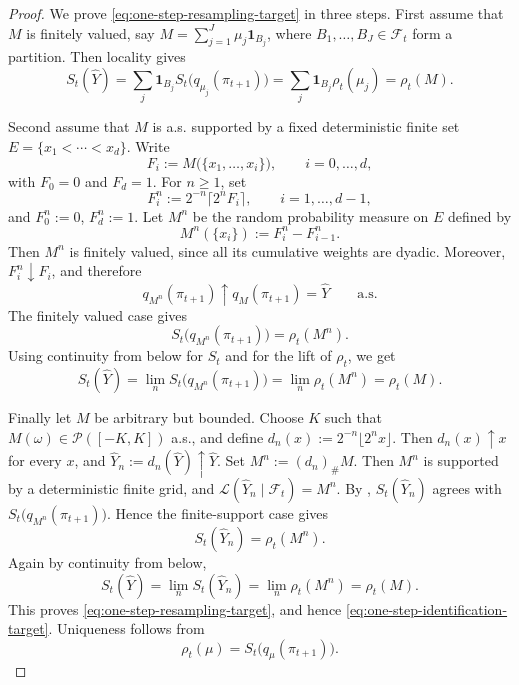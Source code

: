 \documentclass[a4paper]{amsart}
\theoremstyle{definition}
\newcommand{\F}{\mathcal{F}}
\newcommand{\law}{\mathcal{L}}
\newcommand{\Pc}{\mathcal P}
\begin{document}
\begin{proof}
We prove \eqref{eq:one-step-resampling-target} in three steps. First assume
that \(M\) is finitely valued, say
\(M=\sum_{j=1}^J\mu_j\mathbf 1_{B_j}\), where
\(B_1,\dots,B_J\in\F_t\) form a partition. Then locality gives
\[
S_t(\widehat Y)
=
\sum_j\mathbf 1_{B_j}S_t\big(q_{\mu_j}(\pi_{t+1})\big)
=
\sum_j\mathbf 1_{B_j}\rho_t(\mu_j)
=
\rho_t(M).
\]

Second assume that \(M\) is a.s. supported by a fixed deterministic finite set
\(E=\{x_1<\cdots<x_d\}\). Write
\[
F_i:=M\big(\{x_1,\dots,x_i\}\big),
\qquad i=0,\dots,d,
\]
with \(F_0=0\) and \(F_d=1\). For \(n\ge1\), set
\[
F_i^n:=2^{-n}\lceil 2^nF_i\rceil,
\qquad i=1,\dots,d-1,
\]
and \(F_0^n:=0\), \(F_d^n:=1\). Let \(M^n\) be the random probability measure
on \(E\) defined by
\[
M^n(\{x_i\}) := F_i^n-F_{i-1}^n.
\]
Then \(M^n\) is finitely valued, since all its cumulative weights are dyadic.
Moreover, \(F_i^n\downarrow F_i\), and therefore
\[
q_{M^n}(\pi_{t+1})\uparrow q_M(\pi_{t+1})=\widehat Y
\qquad\text{a.s.}
\]
The finitely valued case gives
\[
S_t\big(q_{M^n}(\pi_{t+1})\big)=\rho_t(M^n).
\]
Using continuity from below for \(S_t\) and for the lift of \(\rho_t\), we get
\[
S_t(\widehat Y)
=
\lim_n S_t\big(q_{M^n}(\pi_{t+1})\big)
=
\lim_n \rho_t(M^n)
=
\rho_t(M).
\]

Finally let \(M\) be arbitrary but bounded. Choose \(K\) such that
\(M(\omega)\in\Pc([-K,K])\) a.s., and define
\(d_n(x):=2^{-n}\lfloor 2^nx\rfloor\). Then \(d_n(x)\uparrow x\) for every
\(x\), and \(\widehat Y_n:=d_n(\widehat Y)\uparrow \widehat Y\). Set
\(M^n:=(d_n)_\#M\). Then \(M^n\) is supported by a deterministic finite grid,
and \(\law(\widehat Y_n\mid\F_t)=M^n\). By
, \(S_t(\widehat Y_n)\) agrees with
\(S_t\big(q_{M^n}(\pi_{t+1})\big)\). Hence the finite-support case gives
\[
S_t(\widehat Y_n)=\rho_t(M^n).
\]
Again by continuity from below,
\[
S_t(\widehat Y)
=
\lim_n S_t(\widehat Y_n)
=
\lim_n \rho_t(M^n)
=
\rho_t(M).
\]
This proves \eqref{eq:one-step-resampling-target}, and hence
\eqref{eq:one-step-identification-target}. Uniqueness follows from
\[
\rho_t(\mu)=S_t\big(q_\mu(\pi_{t+1})\big).
\]
\end{proof}
\end{document}
